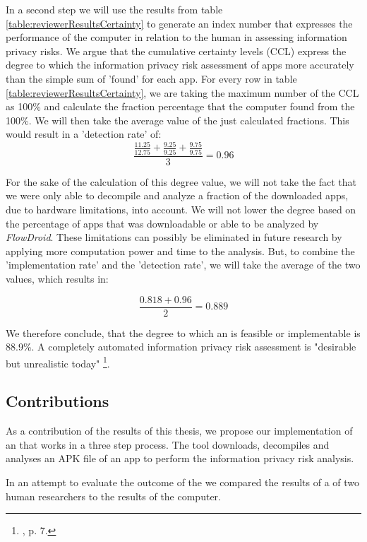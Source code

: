 In a second step we will use the results from table \ref{table:reviewerResultsCertainty} to generate an index number that expresses the performance of the computer in relation to the human in assessing information privacy risks.
We argue that the cumulative certainty levels (CCL) express the degree to which  the information privacy risk assessment of \mH apps more accurately than the simple sum of 'found' \ipp for each app.
For every row in table \ref{table:reviewerResultsCertainty}, we are taking the maximum number of the CCL as 100\% and calculate the fraction percentage that the computer found from the 100\%.
We will then take the average value of the just calculated fractions.
This would result in a 'detection rate' of:
\begin{equation}
	\frac{\frac{11.25}{12.75} + \frac{9.25}{9.25} + \frac{9.75}{9.75}}{3} = 0.96
\end{equation}

For the sake of the calculation of this degree value, we will not take the fact that we were only able to decompile and analyze a fraction of the downloaded apps, due to hardware limitations, into account.
We will not lower the degree based on the percentage of apps that was downloadable or able to be analyzed by \textit{FlowDroid}.
These limitations can possibly be eliminated in future research by applying more computation power and time to the analysis.
But, to combine the 'implementation rate' and the 'detection rate', we will take the average of the two values, which results in:

\begin{equation}
	\frac{0.818 + 0.96}{2} = 0.889
\end{equation}

We therefore conclude, that the degree to which an \aiprat is feasible or implementable is 88.9\%.
A completely automated information privacy risk assessment is "desirable but unrealistic today" \footnote{\cite{Knorr2015}, p. 7.}.

\subsection{Contributions}

As a contribution of the results of this thesis, we propose our implementation of an \aiprat that works in a three step process.
The tool downloads, decompiles and analyses an APK file of an app to perform the information privacy risk analysis.

In an attempt to evaluate the outcome of the \aiprat we compared the results of a \sca of two human researchers to the results of the computer.

